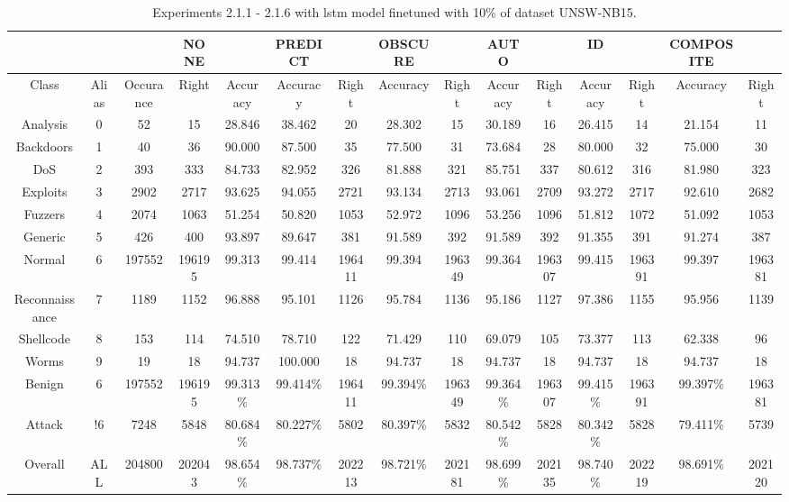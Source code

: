 \begin{table}[htb]
    \centering
    \caption{Experiments 2.1.1 - 2.1.6 with \gls{lstm} model finetuned with 10\% of dataset UNSW-NB15.}
    \label{table:results:lstm:flows15_10}
    \begin{tabular}{@{}ccccccccccccccc@{}}
        \toprule
         &  &  & NONE &  & PREDICT &  & OBSCURE &  & AUTO &  & ID &  & COMPOSITE &  \\
        \midrule
        Class &  Alias &  Occurance &  Right &  Accuracy &  Accuracy &  Right &  Accuracy &  Right &  Accuracy &  Right &  Accuracy &  Right &  Accuracy &  Right \\
        Analysis &  0 &  52 &  15 &  28.846 &  38.462 &  20 &  28.302 &  15 &  30.189 &  16 &  26.415 &  14 &  21.154 &  11 \\
        Backdoors &  1 &  40 &  36 &  90.000 &  87.500 &  35 &  77.500 &  31 &  73.684 &  28 &  80.000 &  32 &  75.000 &  30 \\
        DoS &  2 &  393 &  333 &  84.733 &  82.952 &  326 &  81.888 &  321 &  85.751 &  337 &  80.612 &  316 &  81.980 &  323 \\
        Exploits &  3 &  2902 &  2717 &  93.625 &  94.055 &  2721 &  93.134 &  2713 &  93.061 &  2709 &  93.272 &  2717 &  92.610 &  2682 \\
        Fuzzers &  4 &  2074 &  1063 &  51.254 &  50.820 &  1053 &  52.972 &  1096 &  53.256 &  1096 &  51.812 &  1072 &  51.092 &  1053 \\
        Generic &  5 &  426 &  400 &  93.897 &  89.647 &  381 &  91.589 &  392 &  91.589 &  392 &  91.355 &  391 &  91.274 &  387 \\
        Normal &  6 &  197552 &  196195 &  99.313 &  99.414 &  196411 &  99.394 &  196349 &  99.364 &  196307 &  99.415 &  196391 &  99.397 &  196381 \\
        Reconnaissance &  7 &  1189 &  1152 &  96.888 &  95.101 &  1126 &  95.784 &  1136 &  95.186 &  1127 &  97.386 &  1155 &  95.956 &  1139 \\
        Shellcode &  8 &  153 &  114 &  74.510 &  78.710 &  122 &  71.429 &  110 &  69.079 &  105 &  73.377 &  113 &  62.338 &  96 \\
        Worms &  9 &  19 &  18 &  94.737 &  100.000 &  18 &  94.737 &  18 &  94.737 &  18 &  94.737 &  18 &  94.737 &  18 \\
        Benign &  6 &  197552 &  196195 &  99.313\% &  99.414\% &  196411 &  99.394\% &  196349 &  99.364\% &  196307 &  99.415\% &  196391 &  99.397\% &  196381 \\
        Attack &  !6 &  7248 &  5848 &  80.684\% &  80.227\% &  5802 &  80.397\% &  5832 &  80.542\% &  5828 &  80.342\% &  5828 &  79.411\% &  5739 \\
        Overall &  ALL &  204800 &  202043 &  98.654\% &  98.737\% &  202213 &  98.721\% &  202181 &  98.699\% &  202135 &  98.740\% &  202219 &  98.691\% &  202120 \\
        \bottomrule
    \end{tabular}
\end{table}